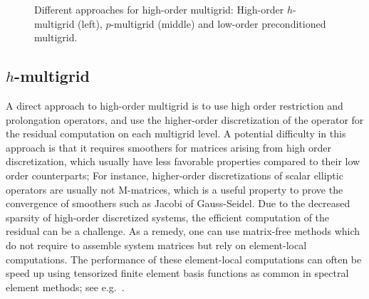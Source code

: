 \documentclass[smallcondensed,final]{svjour3}     %
\begin{document}
\begin{figure}
		\caption{\label{fig:approaches} Different approaches
                  for high-order multigrid: High-order $h$-multigrid
                  (left), $p$-multigrid (middle) and low-order
                  preconditioned multigrid.}
\end{figure}

\subsection{$h$-multigrid}\label{subsec:h}
A direct approach to high-order multigrid is to use high order
restriction and prolongation operators, and use the higher-order
discretization of the operator for the residual computation on each
multigrid level.  A potential difficulty in this approach is that it
requires smoothers for matrices arising from high order
discretization, which usually have less favorable properties compared
to their low order counterparts; For instance, higher-order
discretizations of scalar elliptic operators are usually not
M-matrices, which is a useful property to prove the convergence of
smoothers such as Jacobi of Gauss-Seidel.  Due to the decreased
sparsity of high-order discretized systems, the efficient computation
of the residual can be a challenge. As a remedy, one can use
matrix-free methods which do not require to assemble system matrices
but rely on element-local computations. The performance of these
element-local computations can often be speed up using tensorized
finite element basis functions as common in spectral element methods;
see e.g.~\cite{DevilleFischerMund02}.
\end{document}
